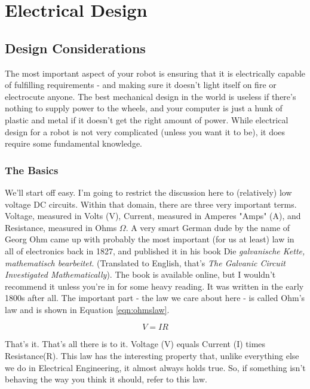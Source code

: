 
\chapter{Electrical Design}
\label{chap:ElecDes}

\section{Design Considerations}
The most important aspect of your robot is ensuring that it is electrically capable of fulfilling requirements - and making sure it doesn't light itself on fire or electrocute anyone. The best mechanical design in the world is useless if there's nothing to supply power to the wheels, and your computer is just a hunk of plastic and metal if it doesn't get the right amount of power. While electrical design for a robot is not very complicated (unless you want it to be), it does require some fundamental knowledge.

\subsection{The Basics}
We'll start off easy. I'm going to restrict the discussion here to (relatively) low voltage DC circuits. Within that domain, there are three very important terms. Voltage, measured in Volts (V), Current, measured in Amperes "Amps" (A), and Resistance, measured in Ohms $\Omega$. A very smart German dude by the name of Georg Ohm came up with probably the most important (for us at least) law in all of electronics back in 1827, and published it in his book Die \textit{galvanische Kette, mathematisch bearbeitet}. (Translated to English, that's \textit{The Galvanic Circuit Investigated Mathematically}). The book is available online, but I wouldn't recommend it unless you're in for some heavy reading. It was written in the early 1800s after all. The important part - the law we care about here - is called Ohm's law and is shown in Equation \ref{eqn:ohmslaw}.

\begin{equation}
V = IR
\label{eqn:ohmslaw}
\end{equation}

That's it. That's all there is to it. Voltage (V) equals Current (I) times Resistance(R). This law has the interesting property that, unlike everything else we do in Electrical Engineering, it almost always holds true. So, if something isn't behaving the way you think it should, refer to this law.

